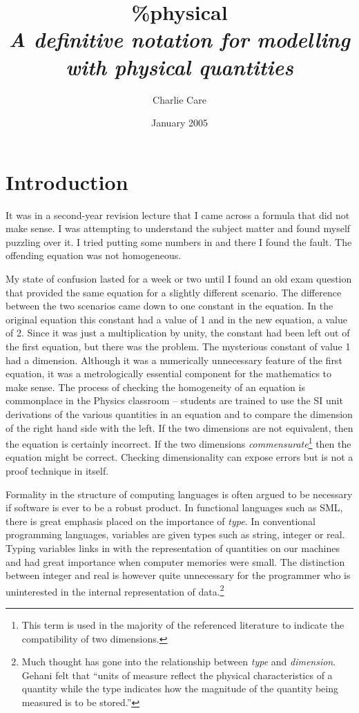 \documentclass[a4paper]{article}
\title{\%physical \\ \itshape \large
   A definitive notation for modelling \\with physical quantities}
\author{Charlie Care}
\date{January 2005}
\begin{document}
\maketitle
\section{Introduction}

It was in a second-year revision lecture that I came across a formula that did 
not make sense. I was attempting to understand the subject matter and found 
myself puzzling over it. I tried putting some numbers in and 
there I found the fault. The offending equation was not homogeneous.

My state of confusion lasted for a week or two until I found an old exam 
question that provided the same equation for a slightly different scenario. The 
difference between the two scenarios came down to one constant in the equation. 
In the original equation this constant had a value of 1 and in the new 
equation, a value of 2. Since it was just a multiplication by unity, the 
constant had been left out of the first equation, but there was the problem. 
The 
mysterious constant of value 1 had a dimension. Although it was a numerically 
unnecessary feature of the first equation, it was a metrologically essential 
component for the mathematics to make sense. The process of checking the 
homogeneity of an equation is commonplace in the Physics classroom -- students 
are trained to use the SI unit derivations of the various quantities in an 
equation and to compare the dimension of the right hand side with the left. If 
the two dimensions are not equivalent, then the equation is certainly 
incorrect. If the two dimensions \emph{commensurate}\footnote{This term is used 
in the 
majority of the referenced literature to indicate the compatibility of two 
dimensions.} then the equation might be correct. Checking dimensionality can 
expose errors but is not a proof technique in itself.

Formality in the structure of computing languages is often argued to be 
necessary if software is ever to be a robust product. In functional languages 
such as SML, there is great emphasis placed on the importance of \emph{type}. 
In conventional programming languages, variables are given types such as 
string, integer or real. Typing variables links in with the representation of 
quantities on our machines and had great importance when computer memories were 
small. The distinction between integer and real is however quite unnecessary 
for the programmer who is uninterested in the 
internal representation of data.\footnote{Much thought has gone into the 
relationship between \emph{type}
and \emph{dimension}. Gehani \cite{ME_gehani} felt that ``units of measure 
reflect the physical characteristics of a quantity while the type indicates how 
the magnitude of the quantity being measured is to be stored.''} 
\end{document}
